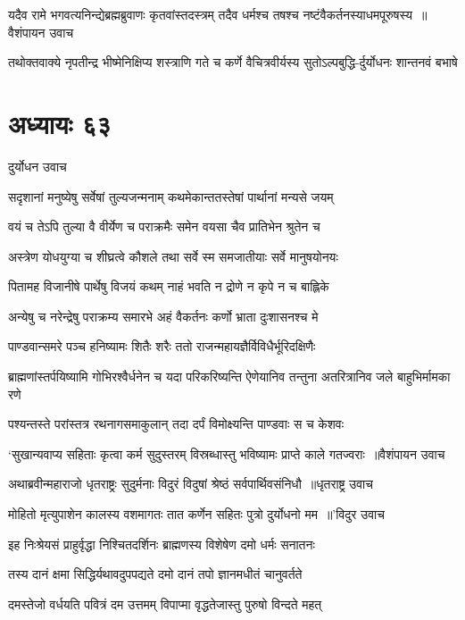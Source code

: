 \threelineshloka
{यदैव रामे भगवत्यनिन्द्येब्रह्मब्रुवाणः कृतवांस्तदस्त्रम्}
{तदैव धर्मश्च तषश्च नष्टंवैकर्तनस्याधमपूरुषस्य ॥वैशंपायन उवाच}
{}


\twolineshloka
{तथोक्तवाक्ये नृपतीन्द्र भीष्मेनिक्षिप्य शस्त्राणि गते च कर्णे}
{वैचित्रवीर्यस्य सुतोऽल्पबुद्धि-र्दुर्योधनः शान्तनवं बभाषे}


\chapter{अध्यायः ६३}
\twolineshloka
{दुर्योधन उवाच}
{}


\twolineshloka
{सदृशानां मनुष्येषु सर्वेषां तुल्यजन्मनाम्}
{कथमेकान्ततस्तेषां पार्थानां मन्यसे जयम्}


\twolineshloka
{वयं च तेऽपि तुल्या वै वीर्येण च पराक्रमैः}
{समेन वयसा चैव प्रातिभेन श्रुतेन च}


\twolineshloka
{अस्त्रेण योधयुग्या च शीघ्रत्वे कौशले तथा}
{सर्वे स्म समजातीयाः सर्वे मानुषयोनयः}


\twolineshloka
{पितामह विजानीषे पार्थेषु विजयं कथम्}
{नाहं भवति न द्रोणे न कृपे न च बाह्लिके}


\twolineshloka
{अन्येषु च नरेन्द्रेषु पराक्रम्य समारभे}
{अहं वैकर्तनः कर्णो भ्राता दुःशासनश्च मे}


\twolineshloka
{पाण्डवान्समरे पञ्च हनिष्यामः शितैः शरैः}
{ततो राजन्महायज्ञैर्विविधैर्भूरिदक्षिणैः}


\threelineshloka
{ब्राह्मणांस्तर्पयिष्यामि गोभिरश्वैर्धनेन च}
{यदा परिकरिष्यन्ति ऐणेयानिव तन्तुना}
{अतरित्रानिव जले बाहुभिर्मामका रणे}


\twolineshloka
{पश्यन्तस्ते परांस्तत्र रथनागसमाकुलान्}
{तदा दर्पं विमोक्ष्यन्ति पाण्डवाः स च केशवः}


\threelineshloka
{`सुखान्यवाप्य सहिताः कृत्वा कर्म सुदुस्तरम्}
{विस्रब्धास्तु भविष्यामः प्राप्ते काले गतज्वराः ॥वैशंपायन उवाच}
{}


\threelineshloka
{अथाब्रवीन्महाराजो धृतराष्ट्रः सुदुर्मनाः}
{विदुरं विदुषां श्रेष्ठं सर्वपार्थिवसंनिधौ ॥धृतराष्ट्र उवाच}
{}


\threelineshloka
{मोहितो मृत्युपाशेन कालस्य वशमागतः}
{तात कर्णेन सहितः पुत्रो दुर्योधनो मम ॥'विदुर उवाच}
{}


\twolineshloka
{इह निःश्रेयसं प्राहुर्वृद्धा निश्चितदर्शिनः}
{ब्राह्मणस्य विशेषेण दमो धर्मः सनातनः}


\twolineshloka
{तस्य दानं क्षमा सिद्धिर्यथावदुपपद्यते}
{दमो दानं तपो ज्ञानमधीतं चानुवर्तते}


\twolineshloka
{दमस्तेजो वर्धयति पवित्रं दम उत्तमम्}
{विपाप्मा वृद्धतेजास्तु पुरुषो विन्दते महत्}



